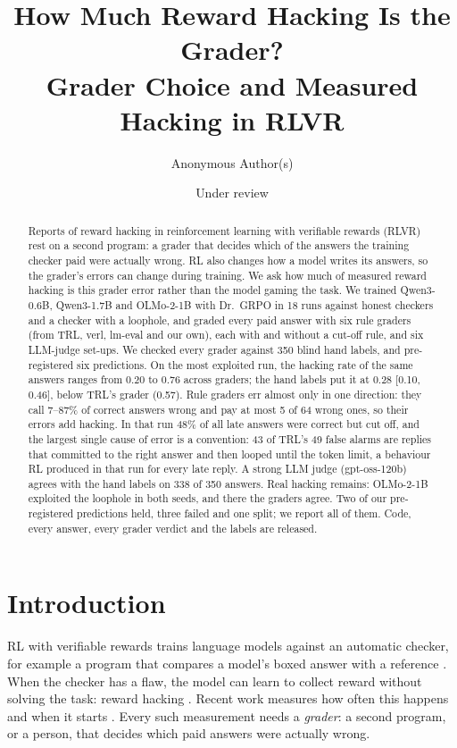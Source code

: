 \documentclass[10pt]{article}
\title{\textbf{How Much Reward Hacking Is the Grader?}\\[2pt]\large Grader Choice and Measured Hacking in RLVR}
\author{Anonymous Author(s)}
\date{Under review}
\begin{document}
\maketitle

\begin{abstract}
Reports of reward hacking in reinforcement learning with verifiable rewards (RLVR) rest on a second
program: a grader that decides which of the answers the training checker paid were actually wrong.
RL also changes how a model writes its answers, so the grader's errors can change during training.
We ask how much of measured reward hacking is this grader error rather than the model gaming the task.
We trained Qwen3-0.6B, Qwen3-1.7B and OLMo-2-1B with Dr.\ GRPO in 18 runs against honest checkers and a
checker with a loophole, and graded every paid answer with six rule graders (from TRL, verl, lm-eval and
our own), each with and without a cut-off rule, and six LLM-judge set-ups. We checked every grader
against 350 blind hand labels, and pre-registered six predictions.
On the most exploited run, the hacking rate of the same answers ranges from 0.20 to 0.76 across graders;
the hand labels put it at 0.28 [0.10, 0.46], below TRL's grader (0.57). Rule
graders err almost only in one direction: they call 7--87\% of correct answers wrong and pay at most 5 of
64 wrong ones, so their errors add hacking. In that run 48\% of all late answers were correct but cut off, and the largest single cause of error is a convention: 43 of TRL's 49 false
alarms are replies that committed to the right answer and then looped until the token limit, a behaviour
RL produced in that run for every late reply. A strong LLM judge (gpt-oss-120b) agrees with the hand
labels on 338 of 350 answers. Real hacking remains: OLMo-2-1B exploited the loophole in both seeds,
and there the graders agree. Two of our pre-registered predictions held, three failed and one split;
we report all of them. Code, every answer, every grader verdict and the labels are released.
\end{abstract}

\section{Introduction}

RL with verifiable rewards trains language models against an automatic checker, for example a program that
compares a model's boxed answer with a reference \citep{deepseekmath,deepseekr1}. When the checker has a
flaw, the model can learn to collect reward without solving the task: reward hacking
\citep{amodei2016concrete,skalse2022defining}. Recent work measures how often this happens and when it
starts \citep{deng2026simhack,helff2026gaming,zhang2026leaky,moya2026verifier}. Every such measurement
needs a \emph{grader}: a second program, or a person, that decides which paid answers were actually wrong.
\end{document}
